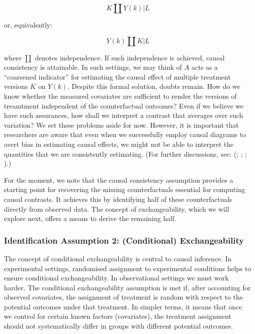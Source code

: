 \documentclass[
  singlecolumn,
  9pt]{article}
\begin{document}
\[
K \coprod Y(k) | L
\]

or, equivalently:

\[
Y(k) \coprod K | L
\]

where \(\coprod\) denotes independence. If such independence is
achieved, causal consistency is attainable. In such settings, we may
think of \(A\) acts as a ``coarsened indicator'' for estimating the
causal effect of multiple treatment versions \(K\) on \(Y(k)\). Despite
this formal solution, doubts remain. How do we know whether the measured
covariates are sufficient to render the versions of treamtment
independent of the counterfactual outcomes? Even if we believe we have
such assurances, how shall we interpret a contrast that averages over
such variation? We set these problems aside for now. However, it is
important that researchers are aware that even when we successfully
employ causal diagrams to avert bias in estimating causal effects, we
might not be able to interpret the quantities that we are consistently
estimating. (For further discussions, see:
(;
;
;
).)

For the moment, we note that the causal consistency assumption provides
a starting point for recovering the missing counterfactuals essential
for computing causal contrasts. It achieves this by identifying half of
these counterfactuals directly from observed data. The concept of
exchangeability, which we will explore next, offers a means to derive
the remaining half.

\subsubsection{Identification Assumption 2: (Conditional)
Exchangeability}\label{identification-assumption-2-conditional-exchangeability}

The concept of conditional exchangeability is central to causal
inference. In experimental settings, randomised assignment to
experimental conditions helps to ensure conditional exchangeability. In
observational settings we must work harder. The conditional
exchangeability assumption is met if, after accounting for observed
covariates, the assignment of treatment is random with respect to the
potential outcomes under that treatment. In simpler terms, it means that
once we control for certain known factors (covariates), the treatment
assignment should not systematically differ in groups with different
potential outcomes.
\end{document}
